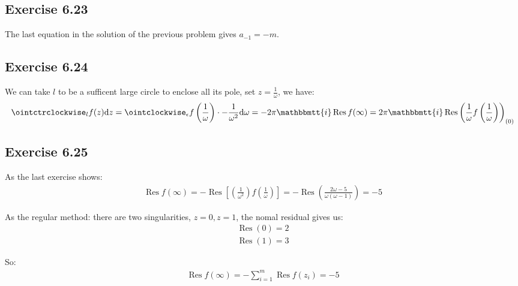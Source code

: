 \documentclass[]{ctexart}
\newcommand{\mi}{\mathbbmtt{i}}
\newcommand{\di}{\mathrm{d}}
\begin{document}
	\subsection{Exercise 6.23}
	The last equation in the solution of the previous problem gives $a_{-1}=-m$. 
	
	\subsection{Exercise 6.24}
		We can take $l$ to be a sufficent large circle to enclose all its pole, set $z=\frac{1}{\omega}$, we have:
			\begin{equation*}
			\begin{aligned}
				\ointctrclockwise _lf(z)\di z=\ointclockwise_{\epsilon} f\left(\frac{1}{\omega}\right)\cdot -\frac{1}{\omega^2}\di \omega=-2\pi \mi \operatorname{Res}f(\infty)=2\pi \mi \operatorname{Res}\left(\frac{1}{\omega}f\left(\frac{1}{\omega}\right)\right)_{(0)}
			\end{aligned}
			\end{equation*}
		
	\subsection{Exercise 6.25}
		As the last exercise shows:
			\begin{equation*}
			\begin{aligned}
				\operatorname{Res}f(\infty)=-\operatorname{Res}\left[\left(\frac{1}{\omega^2}\right)f\left(\frac{1}{\omega}\right)\right]=-\operatorname{Res}\left(\frac{2\omega-5}{\omega(\omega-1)}\right)=-5
			\end{aligned}
			\end{equation*}
			
		As the regular method: there are two singularities, $z=0,z=1$, the nomal residual gives us:
			\begin{equation*}
			\begin{aligned}
				\operatorname{Res}(0)=2\\
				\operatorname{Res}(1)=3
			\end{aligned}
			\end{equation*}
			
		So:
			\begin{equation*}
			\begin{aligned}
				\operatorname{Res}f(\infty)=-\sum_{i=1}^{m}\operatorname{Res}f(z_i)=-5
			\end{aligned}
			\end{equation*}
			
\end{document}
